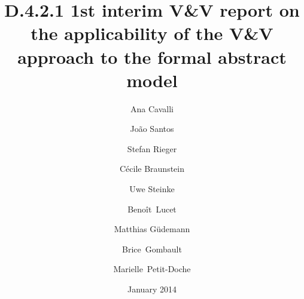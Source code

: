 \documentclass{template/openetcs_article}
\begin{document}
\frontmatter
{}




\title{D.4.2.1 1st interim V\&V report on the applicability of the V\&V approach to the formal abstract model}

\subtitle{}

\date{January 2014}

\author{Ana Cavalli \and João Santos}

  
\author{Stefan Rieger}


\author{Cécile Braunstein}
  
\author{Uwe Steinke}

\author{Benoît~Lucet \and Matthias Güdemann \and Brice~Gombault \and Marielle~Petit-Doche} 

  

\reporttype{}






\maketitle
\tableofcontents
\listoffiguresandtables
\newpage

\end{document}
